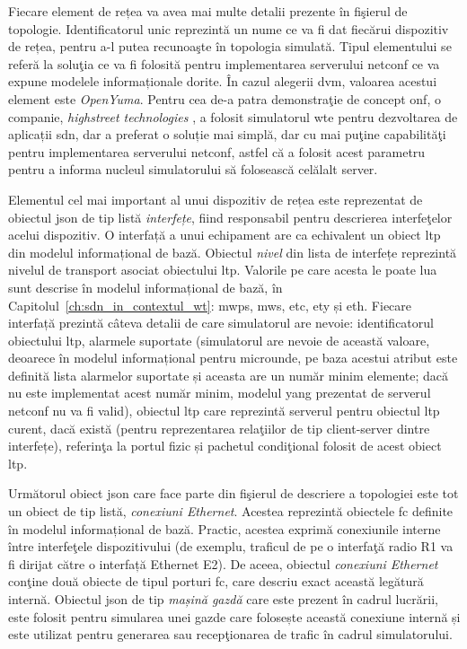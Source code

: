 Fiecare element de rețea va avea mai multe detalii prezente în fişierul de topologie. Identificatorul unic reprezintă un nume ce va fi dat fiecărui dispozitiv de rețea, pentru a-l putea recunoaşte în topologia simulată. Tipul elementului se referă la soluţia ce va fi folosită pentru implementarea serverului \gls{netconf} ce va expune modelele informaționale dorite. În cazul alegerii \gls{dvm}, valoarea acestui element este \textit{OpenYuma}. Pentru cea de-a patra demonstraţie de concept \gls{onf}, o companie, \textit{highstreet technologies} \cite{onf2017_poc4}, a folosit simulatorul \gls{wte} pentru dezvoltarea de aplicații \gls{sdn}, dar a preferat o soluție mai simplă, dar cu mai puţine capabilităţi pentru implementarea serverului \gls{netconf}, astfel că a folosit acest parametru pentru a informa nucleul simulatorului să folosească celălalt server. 

Elementul cel mai important al unui dispozitiv de rețea este reprezentat de obiectul \gls{json} de tip listă \textit{interfețe}, fiind responsabil pentru descrierea interfeţelor acelui dispozitiv. O interfață a unui echipament are ca echivalent un obiect \gls{ltp} din modelul informațional de bază. Obiectul \textit{nivel} din lista de interfețe reprezintă nivelul de transport asociat obiectului \gls{ltp}. Valorile pe care acesta le poate lua sunt descrise în modelul informațional de bază, în Capitolul~\ref{ch:sdn_in_contextul_wt}: \gls{mwps}, \gls{mws}, \gls{etc}, \gls{ety} și \gls{eth}. Fiecare interfață prezintă câteva detalii de care simulatorul are nevoie: identificatorul obiectului \gls{ltp}, alarmele suportate (simulatorul are nevoie de această valoare, deoarece în modelul informațional pentru microunde, pe baza acestui atribut este definită lista alarmelor suportate și aceasta are un număr minim elemente; dacă nu este implementat acest număr minim, modelul \gls{yang} prezentat de serverul \gls{netconf} nu va fi valid), obiectul \gls{ltp} care reprezintă serverul pentru obiectul \gls{ltp} curent, dacă există (pentru reprezentarea relaţiilor de tip client-server dintre interfețe), referinţa la portul fizic și pachetul condiţional folosit de acest obiect \gls{ltp}.

Următorul obiect \gls{json} care face parte din fişierul de descriere a topologiei este tot un obiect de tip listă, \textit{conexiuni Ethernet}. Acestea reprezintă obiectele \gls{fc} definite în modelul informațional de bază. Practic, acestea exprimă conexiunile interne între interfeţele dispozitivului (de exemplu, traficul de pe o interfaţă radio R1 va fi dirijat către o interfață Ethernet E2). De aceea, obiectul \textit{conexiuni Ethernet} conţine două obiecte de tipul porturi \gls{fc}, care descriu exact această legătură internă. Obiectul \gls{json} de tip \textit{mașină gazdă} care este prezent în cadrul lucrării, este folosit pentru simularea unei gazde care folosește această conexiune internă și este utilizat pentru generarea sau recepţionarea de trafic în cadrul simulatorului.

